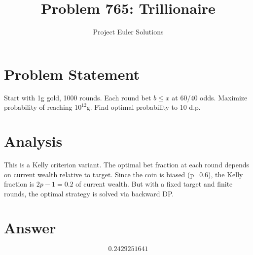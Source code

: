 \documentclass[11pt]{article}
\title{Problem 765: Trillionaire}
\author{Project Euler Solutions}
\date{}
\begin{document}
\maketitle


\section{Problem Statement}
Start with 1g gold, 1000 rounds. Each round bet $b\le x$ at 60/40 odds. Maximize probability of reaching $10^{{12}}$g. Find optimal probability to 10 d.p.

\section{Analysis}
This is a Kelly criterion variant. The optimal bet fraction at each round depends on current wealth relative to target. Since the coin is biased (p=0.6), the Kelly fraction is $2p-1=0.2$ of current wealth. But with a fixed target and finite rounds, the optimal strategy is solved via backward DP.

\section{Answer}

\[
\boxed{0.2429251641}
\]
\end{document}
